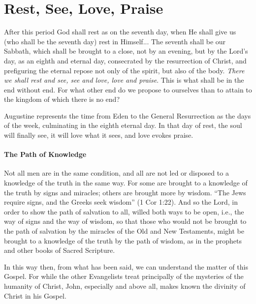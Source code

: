 \section{Rest, See, Love, Praise}

\begin{quotex}
After this period God shall rest as on the seventh day, when He shall give us (who shall be the seventh day) rest in Himself... The seventh shall be our Sabbath, which shall be brought to a close, not by an evening, but by the Lord's day, as an eighth and eternal day, consecrated by the resurrection of Christ, and prefiguring the eternal repose not only of the spirit, but also of the body. \emph{There we shall rest and see, see and love, love and praise}. This is what shall be in the end without end. For what other end do we propose to ourselves than to attain to the kingdom of which there is no end?
\end{quotex}


Augustine represents the time from Eden to the General Resurrection as the days of the week, culminating in the eighth eternal day. In that day of rest, the soul will finally see, it will love what it sees, and love evokes praise.

\paragraph{The Path of Knowledge}


\begin{quotex}
Not all men are in the same condition, and all are not led or disposed to a knowledge of the truth in the same way. For some are brought to a knowledge of the truth by signs and miracles; others are brought more by wisdom. ``The Jews require signs, and the Greeks seek wisdom'' (1 Cor 1:22). And so the Lord, in order to show the path of salvation to all, willed both ways to be open, i.e., the way of signs and the way of wisdom, so that those who would not be brought to the path of salvation by the miracles of the Old and New Testaments, might be brought to a knowledge of the truth by the path of wisdom, as in the prophets and other books of Sacred Scripture.

In this way then, from what has been said, we can understand the matter of this Gospel. For while the other Evangelists treat principally of the mysteries of the humanity of Christ, John, especially and above all, makes known the divinity of Christ in his Gospel.
\end{quotex}


